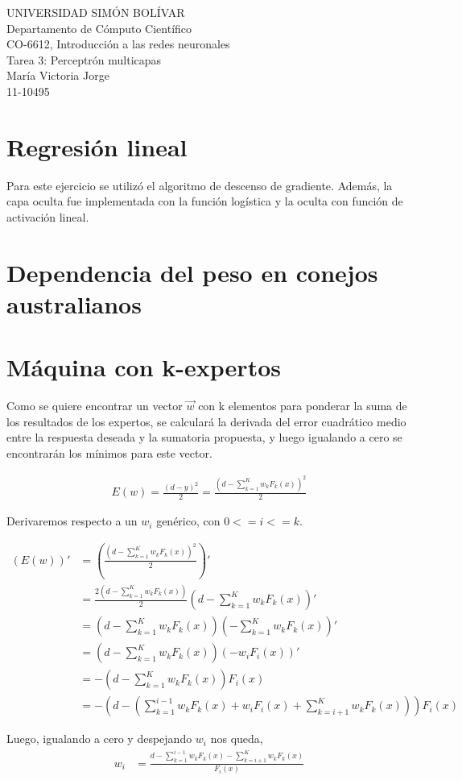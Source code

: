 \documentclass[a4paper]{article}
\begin{document}
\noindent UNIVERSIDAD SIMÓN BOLÍVAR\\
Departamento de Cómputo Científico\\
CO-6612, Introducción a las redes neuronales\\
Tarea 3: Perceptrón multicapas\\
María Victoria Jorge\\
11-10495

\section{Regresión lineal}
Para este ejercicio se utilizó el algoritmo de descenso de gradiente. Además, la capa oculta fue implementada con la función logística y la oculta con función de activación lineal.


\section{Dependencia del peso en conejos australianos}
\section{Máquina con k-expertos}
Como se quiere encontrar un vector $\vec{w}$ con k elementos para ponderar la suma de los resultados de los expertos, se calculará la derivada del error cuadrático medio entre la respuesta deseada y la sumatoria propuesta, y luego igualando a cero se encontrarán los mínimos para este vector.

\begin{align*}
E(w) = \frac{(d - y)^{2}}{2} = \frac{(d - \sum_{k=1}^{K}w_{k}F_{k}(x) )^{2} }{2}
\end{align*}

Derivaremos respecto a un $w_{i}$ genérico, con $0 <= i <= k$.

\begin{align*}
(E(w))' &= (\frac{(d - \sum_{k=1}^{K}w_{k}F_{k}(x) )^{2} }{2})'\\
	    &= \frac{2(d - \sum_{k=1}^{K}w_{k}F_{k}(x) ) }{2}(d - \sum_{k=1}^{K}w_{k}F_{k}(x))'	 \\
	    &= (d - \sum_{k=1}^{K}w_{k}F_{k}(x) )(-\sum_{k=1}^{K}w_{k}F_{k}(x))' \\
	    &= (d - \sum_{k=1}^{K}w_{k}F_{k}(x) )(-w_{i}F_{i}(x))'  \\
	    &= -(d - \sum_{k=1}^{K}w_{k}F_{k}(x) )F_{i}(x)\\
	    &= -(d - (\sum_{k=1}^{i-1}w_{k}F_{k}(x) + w_{i}F_{i}(x) + \sum_{k=i+1}^{K}w_{k}F_{k}(x) ) )F_{i}(x)
\end{align*}

Luego, igualando a cero y despejando $w_{i}$ nos queda,
\begin{align*}
w_{i} &= \frac{d - \sum_{k=1}^{i-1}w_{k}F_{k}(x) - \sum_{k=i+1}^{K}w_{k}F_{k}(x)}{F_{i}(x)}
\end{align*}
\end{document}
